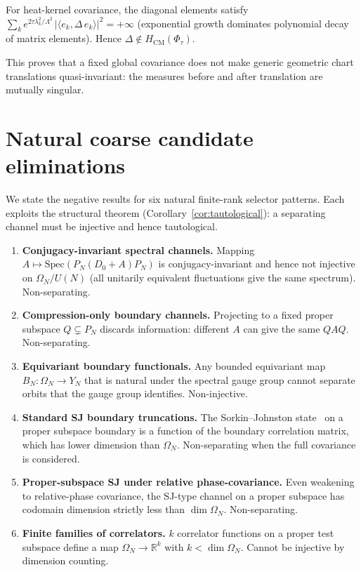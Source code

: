 \documentclass[12pt,a4paper]{article}
\theoremstyle{plain}
\theoremstyle{definition}
\theoremstyle{remark}
\newcommand{\R}{\mathbb{R}}
\newcommand{\Lam}{\Lambda}
\begin{document}
For heat-kernel covariance, the diagonal elements satisfy
$\sum_k e^{2\tau\lambda_k^2/\Lam^2}\,|\langle e_k, \Delta\,e_k\rangle|^2
= +\infty$ (exponential growth dominates polynomial decay of matrix
elements).  Hence $\Delta \notin H_{\mathrm{CM}}(\Phi_\tau)$.

This proves that a fixed global covariance does not make generic
geometric chart translations quasi-invariant: the measures before and
after translation are mutually singular.


\section{Natural coarse candidate eliminations}
\label{app:candidates}

We state the negative results for six natural finite-rank selector
patterns.  Each exploits the structural theorem
(Corollary~\ref{cor:tautological}): a separating channel must be
injective and hence tautological.

\begin{enumerate}[leftmargin=2em]
  \item \textbf{Conjugacy-invariant spectral channels.}\quad
    Mapping $A \mapsto \mathrm{Spec}(P_N(D_0+A)P_N)$ is conjugacy-invariant
    and hence not injective on $\Omega_N/U(N)$ (all unitarily equivalent
    fluctuations give the same spectrum).  Non-separating.

  \item \textbf{Compression-only boundary channels.}\quad
    Projecting to a fixed proper subspace $Q \subsetneq P_N$ discards
    information: different $A$ can give the same $QAQ$.  Non-separating.

  \item \textbf{Equivariant boundary functionals.}\quad
    Any bounded equivariant map $B_N\colon \Omega_N \to Y_N$ that is
    natural under the spectral gauge group cannot separate orbits that
    the gauge group identifies.  Non-injective.

  \item \textbf{Standard SJ boundary truncations.}\quad
    The Sorkin--Johnston state~\cite{AAS:2012} on a proper subspace
    boundary is a function of the boundary correlation matrix, which
    has lower dimension than $\Omega_N$.  Non-separating when the full
    covariance is considered.

  \item \textbf{Proper-subspace SJ under relative phase-covariance.}\quad
    Even weakening to relative-phase covariance, the SJ-type channel
    on a proper subspace has codomain dimension strictly less than
    $\dim\Omega_N$.  Non-separating.

  \item \textbf{Finite families of correlators.}\quad
    $k$ correlator functions on a proper test subspace define a map
    $\Omega_N \to \R^k$ with $k < \dim\Omega_N$.  Cannot be injective
    by dimension counting.
\end{enumerate}
\end{document}
